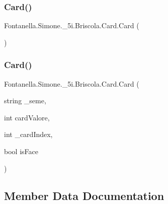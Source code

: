 \subsubsection{\texorpdfstring{Card()}{Card()}\hspace{0.1cm}{\footnotesize\ttfamily [1/2]}}
{\footnotesize\ttfamily Fontanella.\+Simone.\+\_\+5i.\+Briscola.\+Card.\+Card (\begin{DoxyParamCaption}{ }\end{DoxyParamCaption})}

\hypertarget{class_fontanella_1_1_simone_1_1__5i_1_1_briscola_1_1_card_a9a02483c6691e2a69cd4fd49d9587d1b}{}\label{class_fontanella_1_1_simone_1_1__5i_1_1_briscola_1_1_card_a9a02483c6691e2a69cd4fd49d9587d1b} 
\subsubsection{\texorpdfstring{Card()}{Card()}\hspace{0.1cm}{\footnotesize\ttfamily [2/2]}}
{\footnotesize\ttfamily Fontanella.\+Simone.\+\_\+5i.\+Briscola.\+Card.\+Card (\begin{DoxyParamCaption}\item[{string}]{\+\_\+seme,  }\item[{int}]{card\+Valore,  }\item[{int}]{\+\_\+card\+Index,  }\item[{bool}]{is\+Face }\end{DoxyParamCaption})}



\subsection{Member Data Documentation}
\hypertarget{class_fontanella_1_1_simone_1_1__5i_1_1_briscola_1_1_card_a9876fd710f0cc6dd6ddf671a0a8ef0ad}{}\label{class_fontanella_1_1_simone_1_1__5i_1_1_briscola_1_1_card_a9876fd710f0cc6dd6ddf671a0a8ef0ad} 
